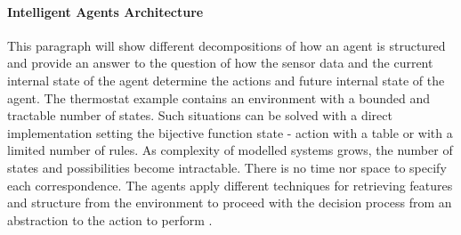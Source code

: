 \documentclass[11pt,oneside,a4paper,openright]{report}
\begin{document}

\paragraph{Intelligent Agents Architecture}

This paragraph will show different decompositions of how an agent is structured 
and provide an answer to the question of how the sensor data and the current internal 
state of the agent determine the actions and future internal state of the agent.
The thermostat example contains an environment with a bounded and tractable number of states.
Such situations can be solved with a direct implementation setting the bijective function 
state - action with a table or with a limited number of rules.
As complexity of modelled systems grows, the number of states and possibilities become
intractable. There is no time nor space to specify each correspondence. The agents apply different 
techniques for retrieving features and structure from the environment to proceed with the
decision process from an abstraction to the action to perform \cite[ch.2]{RussellNorvig}.  
\end{document}
